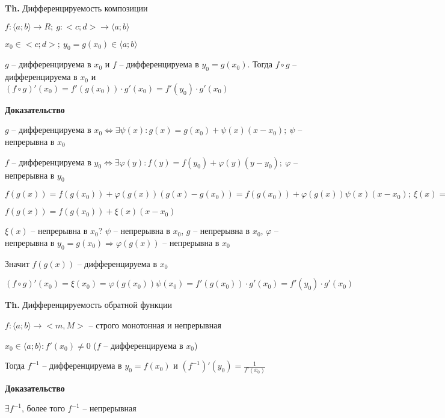 \documentclass[14pt, letter paper]{article}
\newcommand{\q}[1]{\langle #1 \rangle}
\begin{document}
\vspace{5mm}

\textbf{Th.} Дифференцируемость композиции

$f : \q{a; b} \rightarrow R;\ g : <c;d> \rightarrow \q{a; b}$

$x_0 \in <c;d>;\ y_0 = g(x_0) \in \q{a; b}$

$g$ -- дифференцируема в $x_0$ и $f$ -- дифференцируема в $y_0 = g(x_0)$. Тогда $f \circ g$ -- дифференцируема в $x_0$ и $(f \circ g)'(x_0) = f'(g(x_0)) \cdot g'(x_0) = f'(y_0) \cdot g'(x_0)$

\begin{center}
    \textbf{Доказательство}
\end{center}

$g$ -- дифференцируема в $x_0 \Leftrightarrow \exists \psi(x) : g(x) = g(x_0) + \psi(x)(x - x_0);\ \psi$ -- непрерывна в $x_0$

$f$ -- дифференцируема в $y_0 \Leftrightarrow \exists \varphi(y) : f(y) = f(y_0) + \varphi(y)(y - y_0);\ \varphi$ -- непрерывна в $y_0$

$f(g(x)) = f(g(x_0)) + \varphi(g(x))(g(x) - g(x_0)) = f(g(x_0)) + \varphi(g(x))\psi(x)(x - x_0);\ \xi(x) = \varphi(g(x))\psi(x)$

$f(g(x)) = f(g(x_0)) + \xi(x)(x - x_0)$

$\xi(x)$ -- непрерывна в $x_0$? $\psi$ -- непрерывна в $x_0$, $g$ -- непрерывна в $x_0$, $\varphi$ -- непрерывна в $y_0 = g(x_0) \Rightarrow \varphi(g(x))$ -- непрерывна в $x_0$

Значит $f(g(x))$ -- дифференцируема в $x_0$ 

$(f \circ g)'(x_0) = \xi(x_0) = \varphi(g(x_0))\psi(x_0) = f'(g(x_0)) \cdot g'(x_0) = f'(y_0) \cdot g'(x_0)$

\vspace{5mm}

\textbf{Th.} Дифференцируемость обратной функции

$f : \q{a; b} \rightarrow <m, M>$ -- строго монотонная и непрерывная

$x_0 \in \q{a; b} : f'(x_0) \neq 0$ ($f$ -- дифференцируема в $x_0$)

Тогда $f^{-1}$ -- дифференцируема в $y_0 = f(x_0)$ и $(f^{-1})'(y_0) = \frac{1}{f'(x_0)}$

\begin{center}
    \textbf{Доказательство}
\end{center}

$\exists f^{-1}$, более того $f^{-1}$ -- непрерывная
\end{document}
